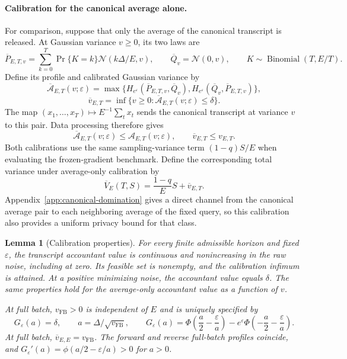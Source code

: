 \documentclass[11pt]{article}
\newtheorem{lemma}[theorem]{Lemma}
\theoremstyle{remark}
\newcommand{\Normal}{\mathcal N}
\begin{document}
\paragraph{Calibration for the canonical average alone.}
For comparison, suppose that only the average of the canonical transcript
is released. At Gaussian variance $v\geq0$, its two laws are
\begin{equation}\label{eq:average-experiment}
 \overline P_{E,T,v}
 =\sum_{k=0}^T\Pr\{K=k\}\Normal(k\Delta/E,v),\qquad
 \overline Q_v=\Normal(0,v),\qquad
 K\sim\operatorname{Binomial}(T,E/T).
\end{equation}
Define its profile and calibrated Gaussian variance by
\[
 \overline{\mathcal A}_{E,T}(v;\varepsilon)
 =\max\{H_{e^\varepsilon}(\overline P_{E,T,v},\overline Q_v),
         H_{e^\varepsilon}(\overline Q_v,\overline P_{E,T,v})\},
\]
\[
 \overline v_{E,T}=\inf\{v\geq0:
       \overline{\mathcal A}_{E,T}(v;\varepsilon)\leq\delta\}.
\]
The map $(x_1,\ldots,x_T)\mapsto E^{-1}\sum_t x_t$ sends the canonical
transcript at variance $v$ to this pair. Data processing therefore gives
\begin{equation}\label{eq:average-transcript-order}
 \overline{\mathcal A}_{E,T}(v;\varepsilon)
 \leq\mathcal A_{E,T}(v;\varepsilon),\qquad
 \overline v_{E,T}\leq v_{E,T}.
\end{equation}
Both calibrations use the same sampling-variance term $(1-q)S/E$ when
evaluating the frozen-gradient benchmark. Define the corresponding total
variance under average-only calibration by
\begin{equation}\label{eq:average-total-variance}
 \overline V_E(T,S)=\frac{1-q}{E}S+\overline v_{E,T}.
\end{equation}
Appendix~\ref{app:canonical-domination} gives a direct channel from the
canonical average pair to each neighboring average of the fixed query,
so this calibration also provides a uniform privacy bound for that class.

\begin{lemma}[Calibration properties]\label{lem:calibration}
For every finite admissible horizon and fixed $\varepsilon$, the transcript
accountant value is continuous and nonincreasing in the raw noise, including
at zero. Its feasible set is nonempty, and the calibration infimum is
attained. At a positive minimizing noise, the accountant value equals
$\delta$. The same properties hold for the average-only accountant value
as a function of $v$.

At full batch, $v_{\mathrm{FB}}>0$ is independent of $E$ and is uniquely
specified by
\begin{equation}\label{eq:gaussian-calibration}
 G_\varepsilon(a)=\delta,\qquad a=\Delta/\sqrt{v_{\mathrm{FB}}},\qquad
 G_\varepsilon(a)=\Phi\!\left(\frac a2-\frac\varepsilon a\right)
 -e^\varepsilon\Phi\!\left(-\frac a2-\frac\varepsilon a\right).
\end{equation}
At full batch, $\overline v_{E,E}=v_{\mathrm{FB}}$.
The forward and reverse full-batch profiles coincide, and
$G_\varepsilon'(a)=\phi(a/2-\varepsilon/a)>0$ for $a>0$.
\end{lemma}
\end{document}
